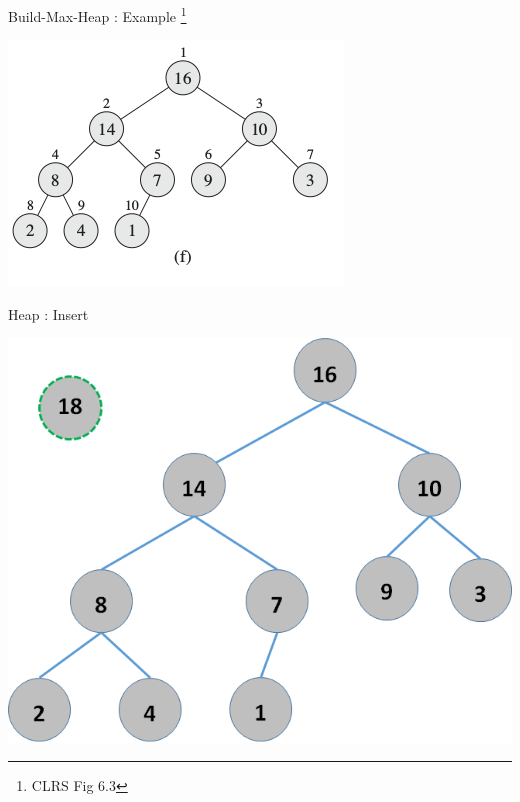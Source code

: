\documentclass{beamer}
\begin{document}
\begin{frame}{Build-Max-Heap : Example \footnote{CLRS Fig 6.3}}
    \begin{center}
        \includegraphics[scale=0.5]{buildMaxHeap6.png}
    \end{center}
\end{frame}

\begin{frame}{Heap : Insert}
    \begin{center}
        \includegraphics[scale=0.5]{heapInsert1.png}
    \end{center}
\end{frame}
\end{document}
